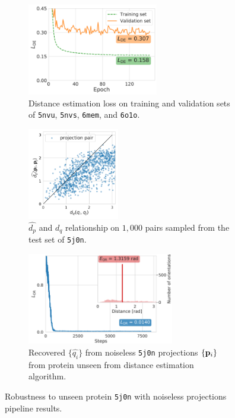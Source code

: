 \begin{figure}[ht!]
    \centering
    \begin{subfigure}[b]{0.32\linewidth}
        \centering
        \includegraphics[height=4cm]{figures/de_5j0n_unseen.pdf}
        \caption{Distance estimation loss on training and validation sets of \texttt{5nvu}, \texttt{5nvs}, \texttt{6mem}, and \texttt{6o1o}.}
    \end{subfigure}
    \hfill
    \begin{subfigure}[b]{0.28\linewidth}
        \centering
        \includegraphics[height=4cm]{figures/dPdQ_5j0n_robustness_to_unseen.pdf}
        \caption{$\widehat{d_p}$ and $d_q$ relationship on $1,000$ pairs sampled from the test set of \texttt{5j0n}.}
    \end{subfigure}
    \hfill
    \begin{subfigure}[b]{0.35\linewidth}
        \centering
        \includegraphics[height=4cm]{figures/5j0n_ar_aa_robustness_to_unseen.pdf}
        \caption{Recovered $\{ \widehat{q_i} \}$ from noiseless \texttt{5j0n} projections $\{ \mathbf{p}_i \}$ from protein unseen from distance estimation algorithm.}
    \end{subfigure}
    \caption{%
        Robustness to unseen protein \texttt{5j0n} with noiseless projections pipeline results.
    }\label{fig:robustness-to-unseen-pipeline}
\end{figure}


